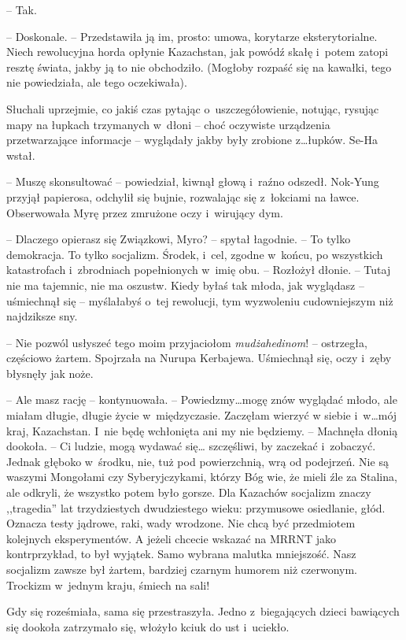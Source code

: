 \documentclass[oneside,polish,11pt,sfheadings]{mwbk}
\begin{document}
-- Tak.

-- Doskonale. -- Przedstawiła ją im, prosto: umowa, korytarze
eksterytorialne. Niech rewolucyjna horda opłynie Kazachstan, jak powódź
skałę i~potem zatopi resztę świata, jakby ją to nie obchodziło. (Mogłoby
rozpaść się na kawałki, tego nie powiedziała, ale tego oczekiwała).

Słuchali uprzejmie, co jakiś czas pytając o~uszczegółowienie, notując,
rysując mapy na łupkach trzymanych w~dłoni -- choć oczywiste urządzenia
przetwarzające informacje -- wyglądały jakby były zrobione z\ldots łupków.
Se-Ha wstał.

-- Muszę skonsultować -- powiedział, kiwnął głową i~raźno odszedł.
Nok-Yung przyjął papierosa, odchylił się bujnie, rozwalając się z~łokciami na ławce. Obserwowała Myrę przez zmrużone oczy i~wirujący dym.

-- Dlaczego opierasz się Związkowi, Myro? -- spytał łagodnie. -- To tylko
demokracja. To tylko socjalizm. Środek, i~cel, zgodne w~końcu, po
wszystkich katastrofach i~zbrodniach popełnionych w~imię obu. -- Rozłożył
dłonie. -- Tutaj nie ma tajemnic, nie ma oszustw. Kiedy byłaś tak młoda,
jak wyglądasz -- uśmiechnął się -- myślałabyś o~tej rewolucji, tym
wyzwoleniu cudowniejszym niż najdziksze sny.

-- Nie pozwól usłyszeć tego moim przyjaciołom \textit{mudżahedinom}! -- ostrzegła, częściowo żartem. Spojrzała na Nurupa Kerbajewa. Uśmiechnął
się, oczy i~zęby błysnęły jak noże.

-- Ale masz rację -- kontynuowała. -- Powiedzmy\ldots mogę znów wyglądać
młodo, ale miałam długie, długie życie w~międzyczasie. Zaczęłam wierzyć
w siebie i~w\ldots mój kraj, Kazachstan. I~nie będę wchłonięta ani my nie
będziemy. -- Machnęła dłonią dookoła. -- Ci ludzie, mogą wydawać się\ldots
szczęśliwi, by zaczekać i~zobaczyć. Jednak głęboko w~środku, nie, tuż
pod powierzchnią, wrą od podejrzeń. Nie są waszymi Mongołami czy
Syberyjczykami, którzy Bóg wie, że mieli źle za Stalina, ale odkryli, że
wszystko potem było gorsze. Dla Kazachów socjalizm znaczy ,,tragedia''
lat trzydziestych dwudziestego wieku: przymusowe osiedlanie, głód.
Oznacza testy jądrowe, raki, wady wrodzone. Nie chcą być przedmiotem
kolejnych eksperymentów. A jeżeli chcecie wskazać na MRRNT jako
kontrprzykład, to był wyjątek. Samo wybrana malutka mniejszość. Nasz
socjalizm zawsze był żartem, bardziej czarnym humorem niż czerwonym.
Trockizm w~jednym kraju, śmiech na sali!

Gdy się roześmiała, sama się przestraszyła. Jedno z~biegających dzieci
bawiących się dookoła zatrzymało się, włożyło kciuk do ust i~uciekło.
\end{document}
